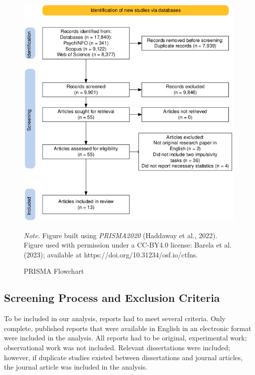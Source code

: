 \documentclass[
  ,pub,floatsintext]{apa6}
\begin{document}
\begin{figure}
\caption{\newline PRISMA Flowchart \label{fig:prisma}}
\begin{center}
\includegraphics[width=0.8\linewidth]{"figures/prisma_chart.png"}
\end{center}

\textit{Note.} Figure built using \textit{PRISMA2020} (Haddaway et al., 2022). Figure used with permission under a CC-BY4.0 license: Barela et al. (2023); available at https://doi.org/10.31234/osf.io/ctfns.
\end{figure}

\hypertarget{screening-process-and-exclusion-criteria}{%
\subsection{Screening Process and Exclusion Criteria}\label{screening-process-and-exclusion-criteria}}

To be included in our analysis, reports had to meet several criteria. Only complete, published reports that were available in English in an electronic format were included in the analysis. All reports had to be original, experimental work; observational work was not included. Relevant dissertations were included; however, if duplicate studies existed between dissertations and journal articles, the journal article was included in the analysis.
\end{document}
